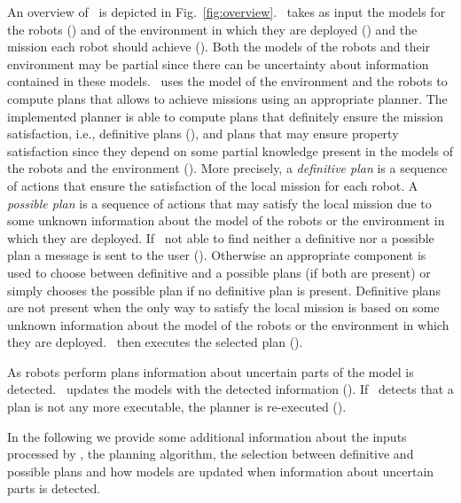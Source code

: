 
An overview of \toolName\ is depicted in Fig.~\ref{fig:overview}.
\toolName\ takes as input the models for the robots () and of the environment in which they are deployed () and the mission each robot should achieve ().
Both the models of the robots and their environment may be partial since there can be uncertainty about information contained in these models.
\toolName\ uses the model of the environment and the robots to compute plans that allows to achieve missions using an appropriate planner.
The implemented planner is able to compute plans that definitely ensure the mission satisfaction, i.e., definitive plans  (), and plans that may ensure property satisfaction since they depend on some partial knowledge present in the models of the robots and the environment  ().
More precisely, a \emph{definitive plan} is a sequence of actions that ensure the satisfaction of the local mission for each robot. 
A \emph{possible plan} is a sequence of actions that may satisfy the local mission due to some unknown information about the model of the robots or the environment in which they are deployed. 
If \toolName\ not able to find neither a definitive nor a possible plan a message is sent to the user ().
Otherwise an appropriate component is used to choose between definitive and a possible plans (if both are present) or simply chooses the possible plan if no definitive plan is present.
Definitive plans are not present when the only way to satisfy the local mission is based on some unknown information about the model of the robots or the environment in which they are deployed. 
\toolName\ then executes the selected plan ().

As robots perform plans information about uncertain parts of the model is detected.
\toolName\ updates the   models with the detected information ().
If \toolName\  detects that a plan is not any more executable, the planner is re-executed ().




In the following we provide some additional information about the inputs processed  by \toolName, the planning algorithm, the selection between definitive and possible plans and how models are updated when information about uncertain parts is detected.




